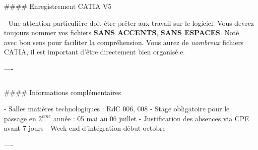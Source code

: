 \documentclass{beamer}
\begin{document}
\begin{frame}[fragile]
\begin{columns}[T]
\begin{column}{.46\textwidth}
\begin{markdown}
#### Enregistrement CATIA V5

- Une attention particulière doit être prêter aux travail sur le logiciel. Vous devrez toujours nommer vos fichiers \textbf{SANS ACCENTS}, \textbf{SANS ESPACES}. Noté avec bon sens pour faciliter la compréhension. Vous aurez de \textit{nombreux} fichiers CATIA, il est important d'être directement bien organisé.e.

----

\end{markdown}
\end{column}
\end{columns}


\bigskip
{\hrulefill}
\bigskip

\begin{markdown}

#### Informations complémentaires

- Salles matières technologiques : RdC 006, 008
- Stage obligatoire pour le passage en $2^{eme}$ année : 05 mai au 06 juillet
- Justification des absences via CPE avant 7 jours
- Week-end d'intégration début octobre

----

\end{markdown}

\end{frame}
\end{document}
